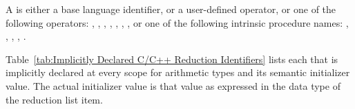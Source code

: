 \begin{fortranspecific}
A  is either a base language identifier, or a user-defined operator,
or one of the following operators:
\code{+},
\code{-},
\code{*},
,
,
,
,
 or one of the following intrinsic procedure names:
,
,
,
,
.
\end{fortranspecific}
%
%
\begin{ccppspecific} %
Table~\ref{tab:Implicitly Declared C/C++ Reduction Identifiers} lists each
 that is implicitly declared at every scope for
arithmetic types and its semantic initializer value. The actual initializer
value is that value as expressed in the data type of the reduction list item.




\end{ccppspecific}
